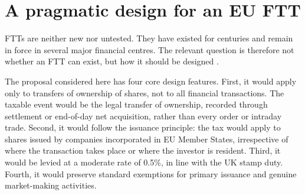 \documentclass[../../main]{subfiles}
\begin{document}





\section{A pragmatic design for an EU FTT}

FTTs are neither new nor untested. They have existed for centuries and remain in force in several major financial centres. The relevant question is therefore not whether an FTT can exist, but how it should be designed \citep{CapelleBlancard2024}.

The proposal considered here has four core design features. First, it would apply only to transfers of ownership of shares, not to all financial transactions. The taxable event would be the legal transfer of ownership, recorded through settlement or end-of-day net acquisition, rather than every order or intraday trade. Second, it would follow the issuance principle: the tax would apply to shares issued by companies incorporated in EU Member States, irrespective of where the transaction takes place or where the investor is resident. Third, it would be levied at a moderate rate of 0.5\%, in line with the UK stamp duty. Fourth, it would preserve standard exemptions for primary issuance and genuine market-making activities.
\end{document}
